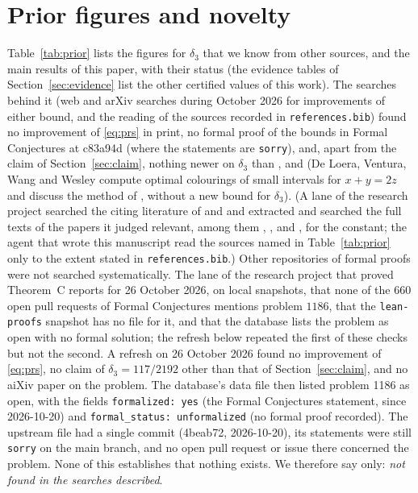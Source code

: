 \documentclass[11pt]{amsart}
\theoremstyle{remark}
\begin{document}
\section{Prior figures and novelty}\label{sec:novelty}
Table~\ref{tab:prior} lists the figures for $\delta_3$ that we know from other sources, and the main results of this paper, with their status (the evidence tables of Section~\ref{sec:evidence} list the other certified values of this work). The searches behind it (web and arXiv searches during October 2026 for improvements of either bound, and the reading of the sources recorded in \texttt{references.bib}) found no improvement of \eqref{eq:prs} in print, no formal proof
of the bounds in Formal Conjectures at c83a94d (where the statements are \texttt{sorry}), and, apart from the claim of Section~\ref{sec:claim}, nothing newer on $\delta_3$ than \cite{PRS08}, \cite{GKW23} and \cite{Sjoland14} (De Loera, Ventura, Wang and Wesley \cite{DVWW25} compute optimal colourings of small intervals for $x+y=2z$ and discuss the method of \cite{PRS08}, without a new bound for $\delta_3$). (A lane of the research project searched the citing literature of \cite{PRS08} and \cite{GKW23} and extracted and searched the full texts of the papers it judged relevant, among them \cite{GKW23}, \cite{Sjoland14}, \cite{YangMao26} and \cite{BCG10}, for the constant; the agent that wrote this manuscript read the sources named in Table~\ref{tab:prior} only to the extent stated in \texttt{references.bib}.) Other repositories of formal proofs were not searched systematically. The lane of the research project that proved Theorem~C reports for 26 October 2026, on local snapshots, that none of the $660$ open pull requests of Formal Conjectures mentions problem $1186$, that the \texttt{lean-proofs} snapshot has no file for it, and that the database lists the problem as open with no formal solution; the refresh below repeated the first of these checks but not the second. A refresh on 26 October 2026 found no improvement of \eqref{eq:prs}, no claim of $\delta_3=117/2192$ other than that of Section~\ref{sec:claim}, and no aiXiv paper on the problem. The database's data file then listed problem 1186 as open, with the fields \texttt{formalized: yes} (the Formal Conjectures statement, since 2026-10-20) and \texttt{formal\_status: unformalized} (no formal proof recorded). The upstream file had a single commit (4beab72, 2026-10-20), its statements were still \texttt{sorry} on the main branch, and no open pull request or issue there concerned the problem. None of this establishes that nothing exists. We therefore say only: \emph{not found in the searches described}.
\end{document}
